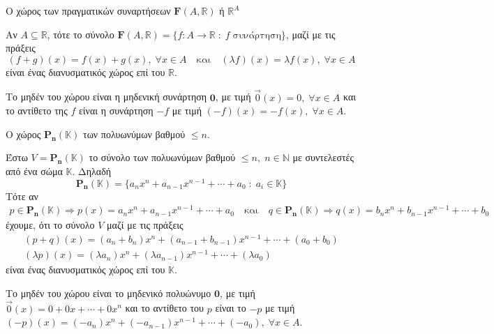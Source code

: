 \begin{example} \label{ex:funs} 
    \textcolor{Col2}{Ο χώρος των πραγματικών συναρτήσεων 
    $\mathbf{F}(A, \mathbb{R})$ ή $\mathbb{R} ^{A}$}

    Αν $ A \subseteq \mathbb{R} $, τότε το σύνολο 
    $ \mathbf{F}{(A, \mathbb{R})} = 
    \{ f \colon A \to \mathbb{R} \; : \; f \; \text{συνάρτηση} \} $, μαζί με 
    τις πράξεις
    \[
        (f+g)(x) = f(x) +g(x), \; \forall x \in A \quad \text{και} 
        \quad (\lambda f)(x)= \lambda f(x), \; \forall x \in A
    \] 
    είναι ένας διανυσματικός χώρος επί του $ \mathbb{R} $.

    Το μηδέν του χώρου είναι η μηδενική συνάρτηση $ \mathbf{0} $, με τιμή 
    $ \vec{0}(x)=0, \; \forall x \in A $ και το αντίθετο της $f$ είναι 
    η συνάρτηση $ -f $ με τιμή $ (-f)(x) = - f(x), \; \forall x \in A $.
\end{example}

\begin{example}
    \textcolor{Col2}{Ο χώρος $\mathbf{P_{n}(\mathbb{K})}$ των 
    πολυωνύμων βαθμού $ \leq n $}.

    Έστω $ V = \mathbf{P_{n}}(\mathbb{K}) $ το σύνολο των πολυωνύμων βαθμού 
    $ \leq n, \; n \in \mathbb{N}  $ με συντελεστές από ένα σώμα 
    $ \mathbb{K} $. Δηλαδή 
    \[
        \mathbf{P_{n}}(\mathbb{K}) = \{ a_{n}x^{n}+a_{n-1}x^{n-1}+\cdots +
        a_{0} \; : \; a_{i} \in \mathbb{K} \}  
    \]
    Τότε αν 
    \begin{gather*}
        p \in \mathbf{P_{n}}(\mathbb{K}) \Rightarrow p(x)
        = a_{n}x^{n}+a_{n-1}x^{n-1}+\cdots + a_{0} \quad \text{και} 
        \quad q \in \mathbf{P_{n}}(\mathbb{K}) \Rightarrow 
        q(x) = b_{n}x^{n}+b_{n-1}x^{n-1}+\cdots + b_{0} 
    \end{gather*} 
    έχουμε, ότι το σύνολο $ V $ μαζί με τις πράξεις 
    \begin{gather*}
        (p+q)(x) = (a_{n}+ b_{n})x^{n} + 
        (a_{n-1}+b_{n-1})x^{n-1}+ \cdots + (a_{0}+ b_{0}) \\
        (\lambda p)(x) = (\lambda a_{n})x^{n}+
        ( \lambda a_{n-1})x^{n-1}+ \cdots + ( \lambda a_{0})
    \end{gather*} 
    είναι ένας διανυσματικός χώρος επί του $ \mathbb{K} $.

    Το μηδέν του χώρου είναι το μηδενικό πολυώνυμο $ \mathbf{0} $, 
    με τιμή $ \vec{0}(x)=0+0x+\cdots +0x^{n} $ και το αντίθετο του 
    $p$ είναι το $ - p $ με τιμή $ (- p)(x) = 
    (-a_{n})x^{n}+(-a_{n-1})x^{n-1}+\cdots + (-a_{0}), \; \forall x \in A $.  
\end{example}

